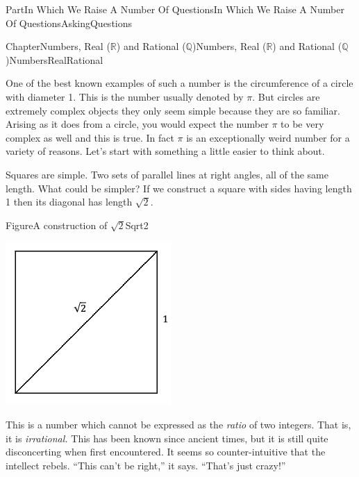 \documentclass[oneside,10pt,]{book}
\numberwithin{equation}{part}
\newcommand{\RR}{\mathbb {R}}
\newcommand{\QQ}{\mathbb {Q}}
\begin{document}
\begin{partptx}{Part}{In Which We Raise A Number Of Questions}{}{In Which We Raise A Number Of Questions}{}{}{AskingQuestions}
\begin{chapterptx}{Chapter}{Numbers, Real (\(\RR\)) and Rational (\(\QQ\))}{}{Numbers, Real (\(\RR\)) and Rational (\(\QQ\))}{}{}{NumbersRealRational}
\begin{introduction}{}
One of the best known examples of such a number is the circumference of a circle with diameter 1. This is the number usually denoted by \(\pi\). But circles are extremely complex objects \textemdash{} they only seem simple because they are so familiar. Arising as it does from a circle, you would expect the number \(\pi\) to be very complex as well and this is true. In fact \(\pi\) is an exceptionally weird number for a variety of reasons. Let's start with something a little easier to think about.%
\par
{} Squares are simple. Two sets of parallel lines at right angles, all of the same length. What could be simpler? If we construct a square with sides having length 1 then its diagonal has length \(\sqrt{2}\).%
\begin{figureptx}{Figure}{A construction of \(\sqrt{2}\)}{Sqrt2}{}%
\begin{image}{0.25}{0.5}{0.25}{}%
\includegraphics[width=\linewidth]{external/images/Sqrt2.png}
\end{image}%
\tcblower
\end{figureptx}%
This is a number which cannot be expressed as the \emph{ratio} of two integers.  That is, it is \emph{irrational.} This has been known since ancient times, but it is still quite disconcerting when first encountered.  It seems so counter-intuitive that the intellect rebels.  ``This can't be right,'' it says. ``That's just crazy!''%

\end{introduction}
\end{chapterptx}
\end{partptx}
\end{document}
